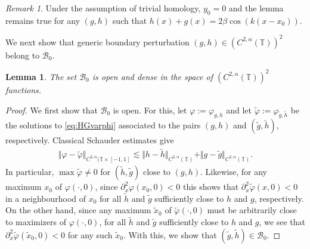 \documentclass[11pt,reqno]{amsproc}
\numberwithin{equation}{section}
\numberwithin{theorem}{section}
\numberwithin{prop}{section}
\numberwithin{cor}{section}
\newtheorem{lemma}{Lemma}
\numberwithin{lemma}{section}
\theoremstyle{remark}
\newtheorem*{remark}{Remark}
\theoremstyle{definition}
\begin{document}
\begin{remark}
Under the assumption of trivial homology, $y_0=0$ and the lemma remains true for any $(g,h)$ such that $h(x)+g(x)=2\beta\cos(k(x-x_0))$.
\end{remark}

We next show that generic boundary perturbation $(g,h)\in (C^{2,\alpha}(\mathbb{T}))^2$ belong to $\mathcal{B}_0$.

\begin{lemma}\label{lemma:nondegmaxboundary}
The set $\mathcal{B}_0$ is open and dense in the space of $(C^{2,\alpha}(\mathbb{T}))^2$ functions.
\end{lemma}

\begin{proof}
We first show that $\mathcal{B}_0$ is open. For this, let $\varphi:=\varphi_{g,h}$ and let $\widetilde{\varphi}:=\varphi_{\widetilde{g},\widetilde{h}}$  be the solutions to \eqref{eq:HGvarphi} associated to the pairs $(g,h)$ and $(\widetilde{g},\widetilde{h})$, respectively. Classical Schauder estimates give
\begin{align*}
\Vert \varphi - \widetilde{\varphi} \Vert_{C^{2,\alpha}(\mathbb{T}\times[-1,1]} \lesssim \Vert h - \widetilde{h}\Vert_{C^{2,\alpha}(\mathbb{T})} + \Vert g - \widetilde{g}\Vert_{C^{2,\alpha}(\mathbb{T})}.
\end{align*}
In particular, $\max \widetilde{\varphi}\neq 0$ for $(\widetilde{h},\widetilde{g})$ close to $(g,h)$. Likewise, for any maximum $x_0$ of $\varphi(\cdot,0)$, since $\partial_x^2\varphi(x_0,0)<0$ this shows that $\partial_x^2\widetilde{\varphi}(x,0)<0$ in a neighbourhood of $x_0$ for all $\widetilde{h}$ and $\widetilde{g}$ sufficiently close to $h$ and $g$, respectively. On the other hand, since any maximum $\widetilde{x}_0$ of $\widetilde{\varphi}(\cdot,0)$ must be arbitrarily close to maximizers of $\varphi(\cdot,0)$, for all $\widetilde{h}$ and $\widetilde{g}$ sufficiently close to $h$ and $g$, we see that  $\partial_x^2\widetilde{\varphi}(\widetilde{x}_0,0)<0$ for any such $\widetilde{x}_0$. With this, we show that $(\widetilde{g},\widetilde{h})\in \mathcal{B}_0$.


\end{proof}
\end{document}
